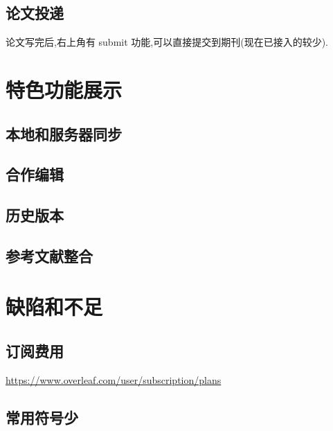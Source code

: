 \documentclass[]{ctexbook}
\begin{document}
\hypertarget{section-5}{%
\section{论文投递}\label{section-5}}

论文写完后,右上角有 submit 功能,可以直接提交到期刊(现在已接入的较少).

\hypertarget{section-6}{%
\chapter{特色功能展示}\label{section-6}}

\hypertarget{section-7}{%
\section{本地和服务器同步}\label{section-7}}

\hypertarget{section-8}{%
\section{合作编辑}\label{section-8}}

\hypertarget{section-9}{%
\section{历史版本}\label{section-9}}

\hypertarget{section-10}{%
\section{参考文献整合}\label{section-10}}

\hypertarget{section-11}{%
\chapter{缺陷和不足}\label{section-11}}

\hypertarget{section-12}{%
\section{订阅费用}\label{section-12}}

\url{https://www.overleaf.com/user/subscription/plans}

\hypertarget{section-13}{%
\section{常用符号少}\label{section-13}}
\end{document}
